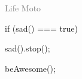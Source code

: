 \begingroup
\thispagestyle{empty}
\vspace*{5cm}
\par\normalfont\fontsize{35}{35}\sffamily\selectfont
\textcolor{gray}{ \textfractionsolidus{} \textfractionsolidus{} Life Moto}

if (sad() === true){

	sad().stop();

	beAwesome();
}

\endgroup